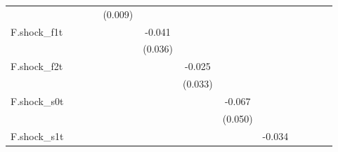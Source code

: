 {\begin{tabular}{l*{12}{c}}
            &                     &                     &                     &     (0.009)         &                     &                     &                     &                     &                     &                     &                     &                     \\
\addlinespace
F.shock\_f1t &                     &                     &                     &                     &      -0.041         &                     &                     &                     &                     &                     &                     &                     \\
            &                     &                     &                     &                     &     (0.036)         &                     &                     &                     &                     &                     &                     &                     \\
\addlinespace
F.shock\_f2t &                     &                     &                     &                     &                     &      -0.025         &                     &                     &                     &                     &                     &                     \\
            &                     &                     &                     &                     &                     &     (0.033)         &                     &                     &                     &                     &                     &                     \\
\addlinespace
F.shock\_s0t &                     &                     &                     &                     &                     &                     &      -0.067         &                     &                     &                     &                     &                     \\
            &                     &                     &                     &                     &                     &                     &     (0.050)         &                     &                     &                     &                     &                     \\
\addlinespace
F.shock\_s1t &                     &                     &                     &                     &                     &                     &                     &      -0.034         &                     &                     &                     &                     \\

\end{tabular}}
